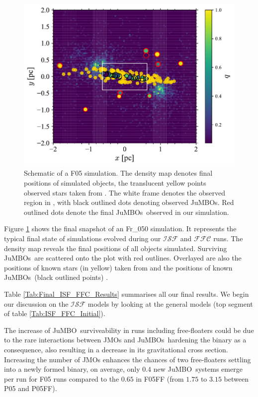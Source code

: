 \documentclass[submission,phys]{lib/SciPost}
\newcommand{\jumbo}{\mbox{JuMBO}}
\newcommand{\jumbos}{\mbox{JuMBOs}}
\begin{document}
   
   \begin{figure}
    \centering
        \includegraphics[width=\columnwidth]{figures/overplotting_HEATMAP.pdf}
        \caption{Schematic of a F05 simulation. The density map denotes final positions of simulated objects, the translucent yellow points observed stars taken from \cite{2016A&A...595A...1G, 2023A&A...674A...1G}. The white frame denotes the observed region in \cite{2023arXiv231001231P}, with black outlined dots denoting observed \jumbos. Red outlined dots denote the final \jumbos\, observed in our simulation.}
         \label{Fig:Overplot}
   \end{figure}

Figure \ref{Fig:Overplot} shows the final snapshot of an Fr\_050
simulation. It represents the typical final state of simulations
evolved during our $\mathcal{ISF}$ and $\mathcal{FFC}$ runs. The
density map reveals the final positions of all objects
simulated. Surviving \jumbos\, are scattered onto the plot with red
outlines. Overlayed are also the positions of known stars (in yellow)
taken from \cite{2016A&A...595A...1G, 2023A&A...674A...1G} and the
positions of known \jumbos\, (black outlined points)
\cite{2023arXiv231001231P}.

Table \ref{Tab:Final_ISF_FFC_Results} summarises all our final
results. We begin our discussion on the $\mathcal{ISF}$ models by
looking at the general models (top segment of table
\ref{Tab:ISF_FFC_Initial}).
     
The increase of \jumbo\, surviveability in runs including
free-floaters could be due to the rare interactions between JMOs and
\jumbos\, hardening the binary as a consequence, also resulting in a
decrease in its gravitational cross section.  Increasing the number of
JMOs enhances the chances of two free-floaters settling into a newly
formed binary, on average, only $0.4$ new \jumbo\, systems emerge per
run for F05 runs compared to the $0.65$ in F05FF (from $1.75$ to
$3.15$ between P05 and P05FF).
    
\end{document}
